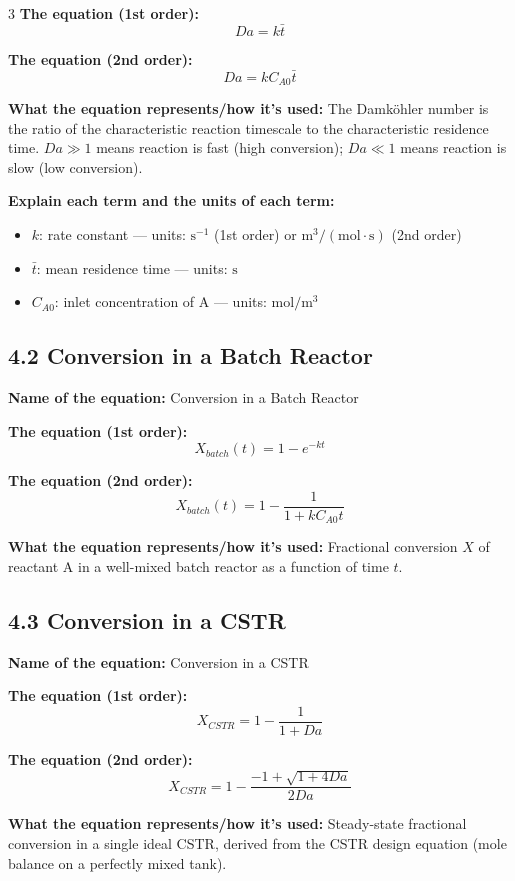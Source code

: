 \documentclass[8pt]{extarticle}
\begin{document}
\begin{multicols*}{3}
\textbf{The equation (1st order):}
\[
Da=k\bar{t}
\]

\textbf{The equation (2nd order):}
\[
Da=kC_{A0}\bar{t}
\]

\textbf{What the equation represents/how it's used:} The Damk\"ohler number is the ratio of the characteristic reaction timescale to the characteristic residence time. \(Da\gg 1\) means reaction is fast (high conversion); \(Da\ll 1\) means reaction is slow (low conversion).

\textbf{Explain each term and the units of each term:}
\begin{itemize}
\item \(k\): rate constant --- units: \(\mathrm{s^{-1}}\) (1st order) or \(\mathrm{m^3/(mol\cdot s)}\) (2nd order)
\item \(\bar{t}\): mean residence time --- units: \(\mathrm{s}\)
\item \(C_{A0}\): inlet concentration of A --- units: \(\mathrm{mol/m^3}\)
\end{itemize}

\subsection*{4.2 Conversion in a Batch Reactor}

\textbf{Name of the equation:} Conversion in a Batch Reactor

\textbf{The equation (1st order):}
\[
X_{batch}(t)=1-e^{-kt}
\]

\textbf{The equation (2nd order):}
\[
X_{batch}(t)=1-\frac{1}{1+kC_{A0}t}
\]

\textbf{What the equation represents/how it's used:} Fractional conversion \(X\) of reactant A in a well-mixed batch reactor as a function of time \(t\).

\subsection*{4.3 Conversion in a CSTR}

\textbf{Name of the equation:} Conversion in a CSTR

\textbf{The equation (1st order):}
\[
X_{CSTR}=1-\frac{1}{1+Da}
\]

\textbf{The equation (2nd order):}
\[
X_{CSTR}=1-\frac{-1+\sqrt{1+4Da}}{2Da}
\]

\textbf{What the equation represents/how it's used:} Steady-state fractional conversion in a single ideal CSTR, derived from the CSTR design equation (mole balance on a perfectly mixed tank).


\end{multicols*}
\end{document}
